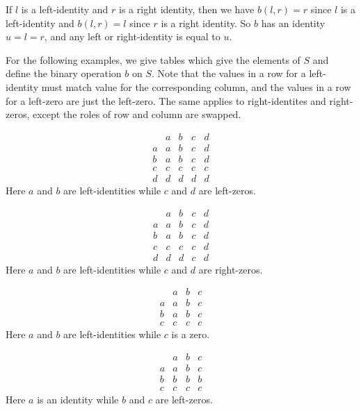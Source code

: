 \begin{solution}
If $l$ is a left-identity and $r$ is a right identity, then we have $b(l,r)=r$ since $l$ is a
left-identity and $b(l,r)=l$ since $r$ is a right identity. So $b$ has an identity $u=l=r$,
and any left or right-identity is equal to $u$.

For the following examples, we give tables which give the elements of $S$ and define
the binary operation $b$ on $S$. Note that the values in a row for a left-identity must match value
for the corresponding column, and the values in a row for a left-zero are just the left-zero.
The same applies to right-identites and right-zeros, except the roles of row and column are swapped.

\begin{enumalpha}
    \item
    \[\begin{array}{c|cccc}
          & a & b & c & d\\
        \hline
        a & a & b & c & d\\
        b & a & b & c & d\\
        c & c & c & c & c\\
        d & d & d & d & d
    \end{array}\]
    Here $a$ and $b$ are left-identities while $c$ and $d$ are left-zeros.

    \item
    \[\begin{array}{c|cccc}
          & a & b & c & d\\
        \hline
        a & a & b & c & d\\
        b & a & b & c & d\\
        c & c & c & c & d\\
        d & d & d & c & d
    \end{array}\]
    Here $a$ and $b$ are left-identities while $c$ and $d$ are right-zeros.

    \item
    \[\begin{array}{c|ccc}
          & a & b & c\\
        \hline
        a & a & b & c\\
        b & a & b & c\\
        c & c & c & c
    \end{array}\]
    Here $a$ and $b$ are left-identities while $c$ is a zero.

    \item
    \[\begin{array}{c|ccc}
          & a & b & c\\
        \hline
        a & a & b & c\\
        b & b & b & b\\
        c & c & c & c
    \end{array}\]
    Here $a$ is an identity while $b$ and $c$ are left-zeros.


\end{enumalpha}
\end{solution}
